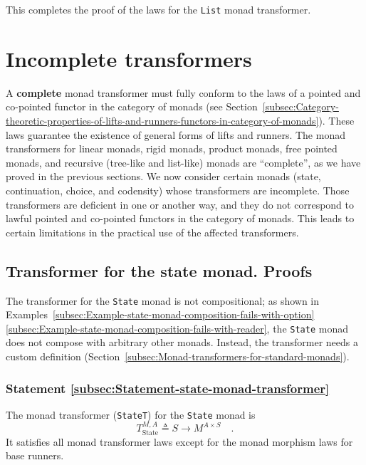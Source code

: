 This completes the proof of the laws for the \lstinline!List! monad
transformer.

\section{Incomplete transformers}

A \textbf{complete} monad
transformer must fully conform to the laws of a pointed and co-pointed
functor in the category of monads (see Section~\ref{subsec:Category-theoretic-properties-of-lifts-and-runners-functors-in-category-of-monads}).
These laws guarantee the existence of general forms of lifts and runners.
The monad transformers for linear monads, rigid monads, product monads,
free pointed monads, and recursive (tree-like and list-like) monads
are \textsf{``}complete\textsf{''}, as we have proved in the previous sections. We
now consider certain monads (state, continuation, choice, and codensity)
whose transformers are incomplete. Those transformers are deficient
in one or another way, and they do not correspond to lawful pointed
and co-pointed functors in the category of monads. This leads to certain
limitations in the practical use of the affected transformers.

\subsection{Transformer for the state monad. Proofs}

The transformer for the \lstinline!State! monad is not compositional;
as shown in Examples~\ref{subsec:Example-state-monad-composition-fails-with-option}\textendash \ref{subsec:Example-state-monad-composition-fails-with-reader},
the \lstinline!State! monad does not compose with arbitrary other
monads. Instead, the transformer needs a custom definition (Section~\ref{subsec:Monad-transformers-for-standard-monads}).

\subsubsection{Statement \label{subsec:Statement-state-monad-transformer}\ref{subsec:Statement-state-monad-transformer}}

The monad transformer (\lstinline!StateT!) for the \lstinline!State!
monad is 
\[
T_{\text{State}}^{M,A}\triangleq S\rightarrow M^{A\times S}\quad.
\]
It satisfies all monad transformer laws except for the monad morphism
laws for base runners.

